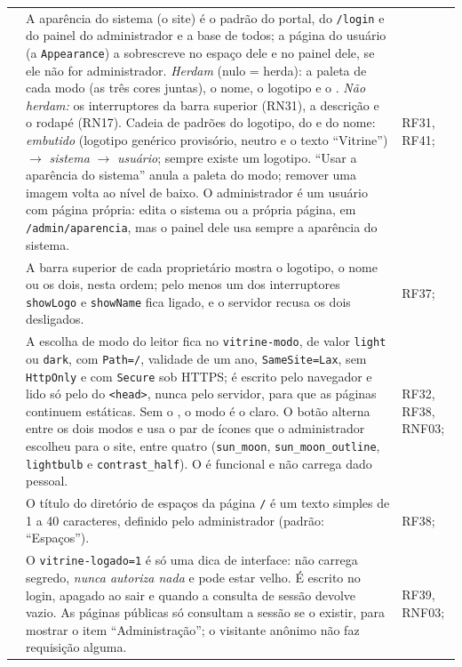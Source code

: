 \begin{longtable}{@{}L{1.3cm}L{9.6cm}L{2.8cm}@{}}
 & A aparência do sistema (o site) é o padrão do portal, do \texttt{/login} e do painel do administrador e a base de todos; a página do usuário (a \texttt{Appearance}) a sobrescreve no espaço dele e no painel dele, se ele não for administrador. \emph{Herdam} (nulo = herda): a paleta de cada modo (as três cores juntas), o nome, o logotipo e o . \emph{Não herdam:} os interruptores da barra superior (RN31), a descrição e o rodapé (RN17). Cadeia de padrões do logotipo, do  e do nome: \emph{embutido} (logotipo genérico provisório,  neutro e o texto ``Vitrine'') $\rightarrow$ \emph{sistema} $\rightarrow$ \emph{usuário}; sempre existe um logotipo. ``Usar a aparência do sistema'' anula a paleta do modo; remover uma imagem volta ao nível de baixo. O administrador é um usuário com página própria: edita o sistema ou a própria página, em \texttt{/admin/aparencia}, mas o painel dele usa sempre a aparência do sistema. & RF31, RF41; \\[1pt]
 & A barra superior de cada proprietário mostra o logotipo, o nome ou os dois, nesta ordem; pelo menos um dos interruptores \texttt{showLogo} e \texttt{showName} fica ligado, e o servidor recusa os dois desligados. & RF37; \\[1pt]
 & A escolha de modo do leitor fica no  \texttt{vitrine-modo}, de valor \texttt{light} ou \texttt{dark}, com \texttt{Path=/}, validade de um ano, \texttt{SameSite=Lax}, sem \texttt{HttpOnly} e com \texttt{Secure} sob HTTPS; é escrito pelo navegador e lido só pelo  do \texttt{<head>}, nunca pelo servidor, para que as páginas continuem estáticas. Sem o , o modo é o claro. O botão alterna entre os dois modos e usa o par de ícones que o administrador escolheu para o site, entre quatro (\texttt{sun\_moon}, \texttt{sun\_moon\_outline}, \texttt{lightbulb} e \texttt{contrast\_half}). O  é funcional e não carrega dado pessoal. & RF32, RF38, RNF03; \\[1pt]
 & O título do diretório de espaços da página \texttt{/} é um texto simples de 1 a 40 caracteres, definido pelo administrador (padrão: ``Espaços''). & RF38; \\[1pt]
 & O  \texttt{vitrine-logado=1} é só uma dica de interface: não carrega segredo, \emph{nunca autoriza nada} e pode estar velho. É escrito no login, apagado ao sair e quando a consulta de sessão devolve vazio. As páginas públicas só consultam a sessão se o  existir, para mostrar o item ``Administração''; o visitante anônimo não faz requisição alguma. & RF39, RNF03; \\[1pt]

\end{longtable}
